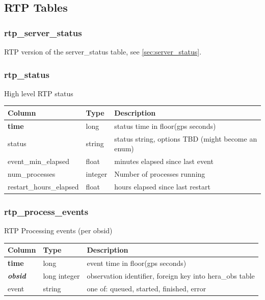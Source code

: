 \documentclass{article}
\begin{document}
{\subsection{RTP Tables}
\subsubsection{rtp\_server\_status}
RTP version of the server\_status table, see \ref{sec:server_status}.

\subsubsection{rtp\_status}
High level RTP status
\begin{center}
 \begin{tabular}{| p{4cm} | p{2cm} | p{10cm} |}
\hline
 {\bf Column} & {\bf Type}  & {\bf Description} \\ [0.5ex]  \hline\hline
\textbf{time} & long & status time in floor(gps seconds)\\ \hline
status & string & status string, options TBD (might become an enum) \\\hline
event\_min\_elapsed & float & minutes elapsed since last event \\\hline
num\_processes & integer & Number of processes running  \\\hline
restart\_hours\_elapsed & float & hours elapsed since last restart \\\hline
\end{tabular}
\end{center}

\subsubsection{rtp\_process\_events}
RTP Processing events (per obsid)
\begin{center}
 \begin{tabular}{| p{4cm} | p{2cm} | p{10cm} |}
\hline
 {\bf Column} & {\bf Type}  & {\bf Description} \\ [0.5ex]  \hline\hline
\textbf{time} & long & event time in floor(gps seconds) \\ \hline
\textit{\textbf{obsid}} & long integer & observation identifier, foreign key into hera\_obs table \\ \hline
event & string & one of: queued, started, finished, error  \\\hline
\end{tabular}
\end{center}

}
\end{document}
